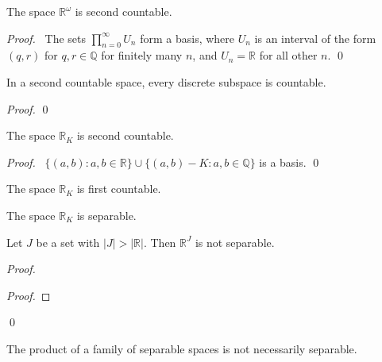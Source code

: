  \begin{prop}
 The space $\mathbb{R}^\omega$ is second countable.
\end{prop}

\begin{proof}
 \pf\ The sets $\prod_{n=0}^\infty U_n$ form a basis, where $U_n$ is an
 interval of the form $(q, r)$ for $q, r \in \mathbb{Q}$ for finitely many
 $n$, and $U_n = \mathbb{R}$ for all other $n$. \qed
\end{proof}

\begin{prop}[CC]
In a second countable space, every discrete subspace is countable.
\end{prop}

\begin{proof}
\pf
{}
\qed
\end{proof}

\begin{prop}
The space $\mathbb{R}_K$ is second countable.
\end{prop}

\begin{proof}
\pf\ $\{ (a,b) : a, b \in \mathbb{R} \} \cup \{ (a, b) - K : a, b \in
\mathbb{Q} \}$ is a basis. \qed
\end{proof}

\begin{cor}
The space $\mathbb{R}_K$ is first countable.
\end{cor}

\begin{cor}
The space $\mathbb{R}_K$ is separable.
\end{cor}

\begin{prop}
Let $J$ be a set with $|J| > |\mathbb{R}|$. Then $\mathbb{R}^J$ is not separable.
\end{prop}

\begin{proof}
\pf
{}
\begin{proof}
\end{proof}
\qed
\end{proof}

\begin{cor}
The product of a family of separable spaces is not necessarily separable.
\end{cor}
